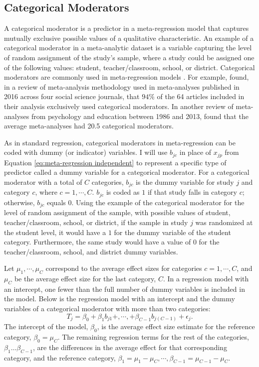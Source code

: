 \subsection{Categorical Moderators} 

A categorical moderator is a predictor in a meta-regression model that captures mutually exclusive possible values of a qualitative characteristic. An example of a categorical moderator in a meta-analytic dataset is a variable capturing the level of random assignment of the study's sample, where a study could be assigned one of the following values: student, teacher/classroom, school, or district. Categorical moderators are commonly used in meta-regression models \autocite{tipton2019, ahn2012}. For example, \textcite{tipton2019} found, in a review of meta-analysis methodology used in meta-analyses published in 2016 across four social science journals, that $94\%$ of the 64 articles included in their analysis exclusively used categorical moderators. In another review of meta-analyses from psychology and education between 1986 and 2013, \textcite{polanin2016} found that the average meta-analyses had 20.5 categorical moderators. 
 
As in standard regression, categorical moderators in meta-regression can be coded with dummy (or indicator) variables. I will use $b_{jc}$ in place of $x_{jp}$ from Equation \ref{eq:meta-regression independent} to represent a specific type of predictor called a dummy variable for a categorical moderator. For a categorical moderator with a total of $C$ categories, $b_{jc}$ is the dummy variable for study $j$ and category $c$, where $c = 1, \cdots, C$. $b_{jc}$ is coded as $1$ if that study falls in category $c$; otherwise, $b_{jc}$ equals $0$. Using the example of the categorical moderator for the level of random assignment of the sample, with possible values of student, teacher/classroom, school, or district, if the sample in study $j$ was randomized at the student level, it would have a $1$ for the dummy variable of the student category. Furthermore, the same study would have a value of $0$ for the teacher/classroom, school, and district dummy variables. 

Let $\mu_1, \cdots, \mu_{C}$ correspond to the average effect sizes for categories $c = 1, \cdots, C$, and $\mu_C$ be the average effect size for the last category, $C$. In a regression model with an intercept, one fewer than the full number of dummy variables is included in the model. Below is the regression model with an intercept and the dummy variables of a categorical moderator with more than two categories:
\begin{equation} \label{eq:intercept-category}
    T_j = \beta_0 + \beta_1 b_{j1} +, \cdots, +   \beta_{C-1}  b_{j(C-1)} 
    +\epsilon_j.
\end{equation}
The intercept of the model, $\beta_0$, is the average effect size estimate for the reference category, $\beta_0 = \mu_C$. The remaining regression terms for the rest of the categories, $\beta_1 \dots \beta_{C-1}$, are the differences in the average effect for that corresponding category, and the reference category, $\beta_1 = \mu_1 - \mu_C, \cdots, \beta_{C-1} = \mu_{C-1} - \mu_C$. 

